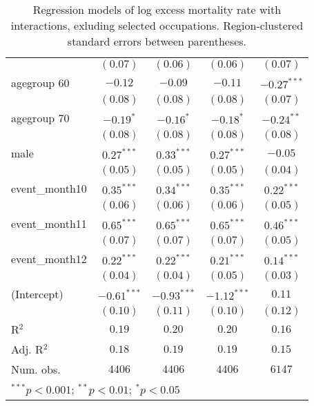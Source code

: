 \begin{table}
\begin{center}
\begin{tabular}{l c c c c}
                             & $(0.07)$      & $(0.06)$      & $(0.06)$      & $(0.07)$      \\
agegroup 60                  & $-0.12$       & $-0.09$       & $-0.11$       & $-0.27^{***}$ \\
                             & $(0.08)$      & $(0.08)$      & $(0.08)$      & $(0.07)$      \\
agegroup 70                  & $-0.19^{*}$   & $-0.16^{*}$   & $-0.18^{*}$   & $-0.24^{**}$  \\
                             & $(0.08)$      & $(0.08)$      & $(0.08)$      & $(0.08)$      \\
male                         & $0.27^{***}$  & $0.33^{***}$  & $0.27^{***}$  & $-0.05$       \\
                             & $(0.05)$      & $(0.05)$      & $(0.05)$      & $(0.04)$      \\
event\_month10               & $0.35^{***}$  & $0.34^{***}$  & $0.35^{***}$  & $0.22^{***}$  \\
                             & $(0.06)$      & $(0.06)$      & $(0.06)$      & $(0.05)$      \\
event\_month11               & $0.65^{***}$  & $0.65^{***}$  & $0.65^{***}$  & $0.46^{***}$  \\
                             & $(0.07)$      & $(0.07)$      & $(0.07)$      & $(0.05)$      \\
event\_month12               & $0.22^{***}$  & $0.22^{***}$  & $0.21^{***}$  & $0.14^{***}$  \\
                             & $(0.04)$      & $(0.04)$      & $(0.05)$      & $(0.03)$      \\
(Intercept)                  & $-0.61^{***}$ & $-0.93^{***}$ & $-1.12^{***}$ & $0.11$        \\
                             & $(0.10)$      & $(0.11)$      & $(0.10)$      & $(0.12)$      \\
\hline
R$^2$                        & $0.19$        & $0.20$        & $0.20$        & $0.16$        \\
Adj. R$^2$                   & $0.18$        & $0.19$        & $0.19$        & $0.15$        \\
Num. obs.                    & $4406$        & $4406$        & $4406$        & $6147$        \\
\hline
\multicolumn{5}{l}{\scriptsize{$^{***}p<0.001$; $^{**}p<0.01$; $^{*}p<0.05$}}
\end{tabular}
\caption{Regression models of log excess mortality rate with interactions, exluding selected occupations. Region-clustered standard errors between parentheses.}
\label{tab:intermodels}
\end{center}
\end{table}
